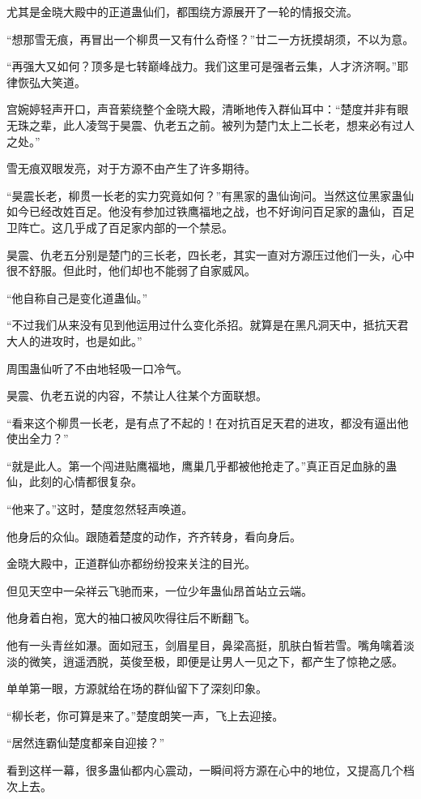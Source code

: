 \begin{this_body}
尤其是金晓大殿中的正道蛊仙们，都围绕方源展开了一轮的情报交流。

“想那雪无痕，再冒出一个柳贯一又有什么奇怪？”廿二一方抚摸胡须，不以为意。

“再强大又如何？顶多是七转巅峰战力。我们这里可是强者云集，人才济济啊。”耶律恢弘大笑道。

宫婉婷轻声开口，声音萦绕整个金晓大殿，清晰地传入群仙耳中：“楚度并非有眼无珠之辈，此人凌驾于昊震、仇老五之前。被列为楚门太上二长老，想来必有过人之处。”

雪无痕双眼发亮，对于方源不由产生了许多期待。

“昊震长老，柳贯一长老的实力究竟如何？”有黑家的蛊仙询问。当然这位黑家蛊仙如今已经改姓百足。他没有参加过铁鹰福地之战，也不好询问百足家的蛊仙，百足卫阵亡。这几乎成了百足家内部的一个禁忌。

昊震、仇老五分别是楚门的三长老，四长老，其实一直对方源压过他们一头，心中很不舒服。但此时，他们却也不能弱了自家威风。

“他自称自己是变化道蛊仙。”

“不过我们从来没有见到他运用过什么变化杀招。就算是在黑凡洞天中，抵抗天君大人的进攻时，也是如此。”

周围蛊仙听了不由地轻吸一口冷气。

昊震、仇老五说的内容，不禁让人往某个方面联想。

“看来这个柳贯一长老，是有点了不起的！在对抗百足天君的进攻，都没有逼出他使出全力？”

“就是此人。第一个闯进贴鹰福地，鹰巢几乎都被他抢走了。”真正百足血脉的蛊仙，此刻的心情都很复杂。

“他来了。”这时，楚度忽然轻声唤道。

他身后的众仙。跟随着楚度的动作，齐齐转身，看向身后。

金晓大殿中，正道群仙亦都纷纷投来关注的目光。

但见天空中一朵祥云飞驰而来，一位少年蛊仙昂首站立云端。

他身着白袍，宽大的袖口被风吹得往后不断翻飞。

他有一头青丝如瀑。面如冠玉，剑眉星目，鼻梁高挺，肌肤白皙若雪。嘴角噙着淡淡的微笑，逍遥洒脱，英俊至极，即便是让男人一见之下，都产生了惊艳之感。

单单第一眼，方源就给在场的群仙留下了深刻印象。

“柳长老，你可算是来了。”楚度朗笑一声，飞上去迎接。

“居然连霸仙楚度都亲自迎接？”

看到这样一幕，很多蛊仙都内心震动，一瞬间将方源在心中的地位，又提高几个档次上去。


\end{this_body}
